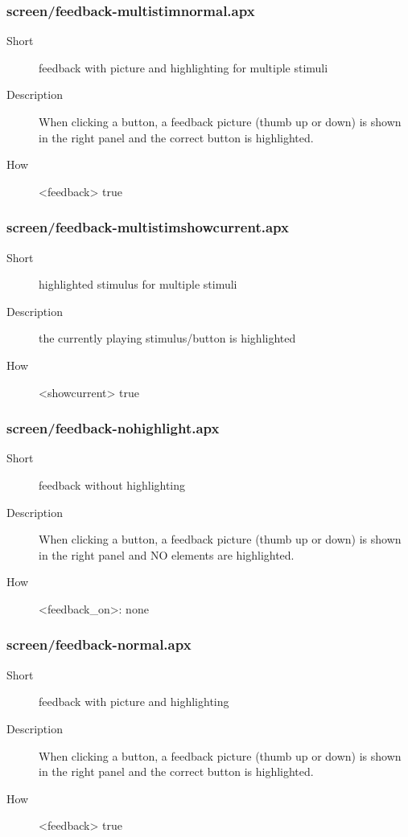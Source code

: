 \subsubsection{screen/feedback-multistimnormal.apx}
\begin{description}
\item[Short] 
 feedback with picture and highlighting for multiple stimuli
\item[Description] 
 When clicking a button, a feedback picture (thumb up or down) is shown in the right panel and the correct button is highlighted.
\item[How] 
 \textless{}feedback\textgreater{} true
\end{description}

\subsubsection{screen/feedback-multistimshowcurrent.apx}
\begin{description}
\item[Short] 
 highlighted stimulus for multiple stimuli
\item[Description] 
 the currently playing stimulus/button is highlighted
\item[How] 
 \textless{}showcurrent\textgreater{} true
\end{description}

\subsubsection{screen/feedback-nohighlight.apx}
\begin{description}
\item[Short] 
 feedback without highlighting
\item[Description] 
 When clicking a button, a feedback picture (thumb up or down) is shown in the right panel and NO elements are highlighted.
\item[How] 
 \textless{}feedback\_on\textgreater{}: none
\end{description}

\subsubsection{screen/feedback-normal.apx}
\begin{description}
\item[Short] 
 feedback with picture and highlighting
\item[Description] 
 When clicking a button, a feedback picture (thumb up or down) is shown in the right panel and the correct button is highlighted.
\item[How] 
 \textless{}feedback\textgreater{} true
\end{description}

